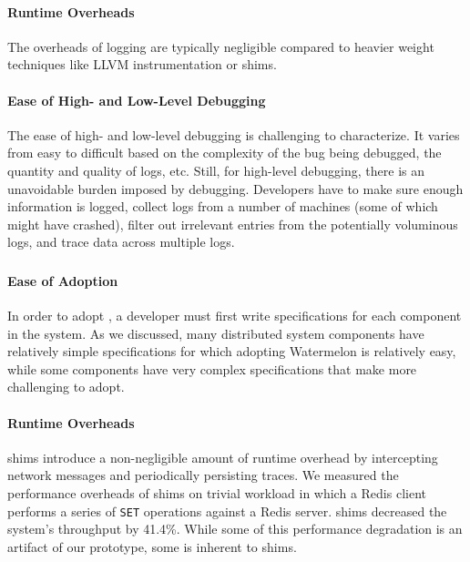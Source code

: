 \paragraph{Runtime Overheads}
The overheads of logging are typically negligible compared to heavier weight
techniques like LLVM instrumentation or \fluent{} shims.

\paragraph{Ease of High- and Low-Level Debugging}
The ease of high- and low-level \printf{} debugging is challenging to
characterize. It varies from easy to difficult based on the complexity of the
bug being debugged, the quantity and quality of logs, etc. Still, for
high-level debugging, there is an unavoidable burden imposed by \printf{}
debugging. Developers have to make sure enough information is logged, collect
logs from a number of machines (some of which might have crashed), filter out
irrelevant entries from the potentially voluminous logs, and trace data across
multiple logs.

\subsubsection{\fluent{}}
\paragraph{Ease of Adoption}
In order to adopt \fluent{}, a developer must first write \watprovenance{}
specifications for each component in the system. As we discussed, many
distributed system components have relatively simple \watprovenance{}
specifications for which adopting Watermelon is relatively easy, while some
components have very complex \watprovenance{} specifications that make
\fluent{} more challenging to adopt.

\paragraph{Runtime Overheads}
\fluent{} shims introduce a non-negligible amount of runtime overhead by
intercepting network messages and periodically persisting traces. We measured
the performance overheads of \fluent{} shims on trivial workload in which a
Redis client performs a series of \texttt{SET} operations against a Redis
server. \fluent{} shims decreased the system's throughput by 41.4\%. While some
of this performance degradation is an artifact of our prototype, some is
inherent to shims.

